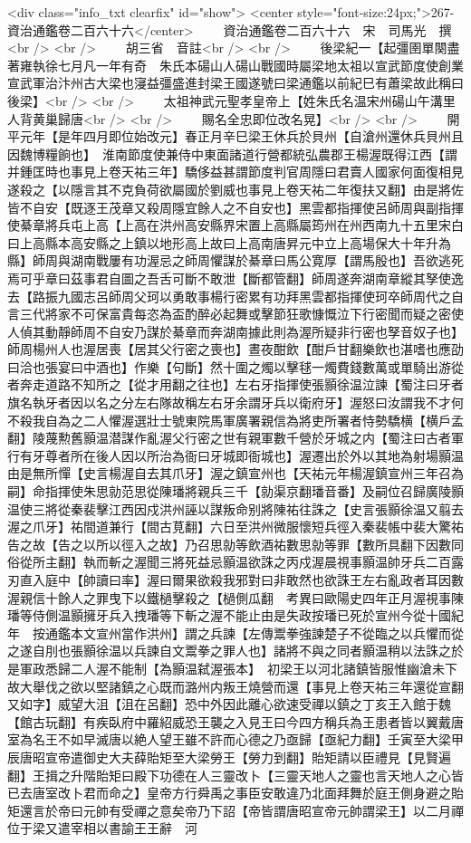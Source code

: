 <div class="info_txt clearfix" id="show">
<center style="font-size:24px;">267-資治通鑑卷二百六十六</center>
  　　資治通鑑卷二百六十六　宋　司馬光　撰<br />
<br />
　　胡三省　音註<br />
<br />
　　後梁紀一【起彊圉單闋盡著雍執徐七月凡一年有奇　朱氏本碭山人碭山戰國時屬梁地太祖以宣武節度使創業宣武軍治汴州古大梁也寖益彊盛進封梁王國遂號曰梁通鑑以前紀巳有蕭梁故此稱曰後梁】<br />
<br />
　　太祖神武元聖孝皇帝上【姓朱氏名温宋州碭山午溝里人背黄巢歸唐<br />
<br />
　　賜名全忠即位改名晃】<br />
<br />
　　開平元年【是年四月即位始改元】春正月辛巳梁王休兵於貝州【自滄州還休兵貝州且因魏博糧餉也】　淮南節度使兼侍中東面諸道行營都統弘農郡王楊渥既得江西【謂并鍾匡時也事見上卷天祐三年】驕侈益甚謂節度判官周隱曰君賣人國家何面復相見遂殺之【以隱言其不克負荷欲屬國於劉威也事見上卷天祐二年復扶又翻】由是將佐皆不自安【既逐王茂章又殺周隱宜餘人之不自安也】黑雲都指揮使呂師周與副指揮使綦章將兵屯上高【上高在洪州高安縣界宋置上高縣屬筠州在州西南九十五里宋白曰上高縣本高安縣之上鎮以地形高上故曰上高南唐昇元中立上高場保大十年升為縣】師周與湖南戰屢有功渥忌之師周懼謀於綦章曰馬公寛厚【謂馬殷也】吾欲逃死焉可乎章曰茲事君自圖之吾舌可斷不敢泄【斷都管翻】師周遂奔湖南章縱其孥使逸去【路振九國志呂師周父珂以勇敢事楊行密累有功拜黑雲都指揮使珂卒師周代之自言三代將家不可保富貴每恣為盃酌醉必起舞或擊節狂歌慷慨泣下行密聞而疑之密使人偵其動靜師周不自安乃謀於綦章而奔湖南據此則為渥所疑非行密也孥音奴子也】師周楊州人也渥居喪【居其父行密之喪也】晝夜酣飲【酣戶甘翻樂飲也湛嗜也應劭曰洽也張宴曰中酒也】作樂【句斷】然十圍之燭以擊毬一燭費錢數萬或單騎出游從者奔走道路不知所之【從才用翻之往也】左右牙指揮使張顥徐温泣諫【蜀注曰牙者旗名執牙者因以名之分左右隊故稱左右牙余謂牙兵以衛府牙】渥怒曰汝謂我不才何不殺我自為之二人懼渥選壯士號東院馬軍廣署親信為將吏所署者恃勢驕横【横戶孟翻】陵蔑勲舊顥温潜謀作亂渥父行密之世有親軍數千營於牙城之内【蜀注曰古者軍行有牙尊者所在後人因以所治為衙曰牙城即衙城也】渥遷出於外以其地為射場顥温由是無所憚【史言楊渥自去其爪牙】渥之鎮宣州也【天祐元年楊渥鎮宣州三年召為嗣】命指揮使朱思勍范思從陳璠將親兵三千【勍渠京翻璠音番】及嗣位召歸廣陵顥温使三將從秦裴擊江西因戍洪州誣以謀叛命别將陳祐往誅之【史言張顥徐温又翦去渥之爪牙】祐間道兼行【間古莧翻】六日至洪州微服懷短兵徑入秦裴帳中裴大驚祐告之故【告之以所以徑入之故】乃召思勍等飲酒祐數思勍等罪【數所具翻下因數同俗從所主翻】執而斬之渥聞三將死益忌顥温欲誅之丙戍渥晨視事顥温帥牙兵二百露刃直入庭中【帥讀曰率】渥曰爾果欲殺我邪對曰非敢然也欲誅王左右亂政者耳因數渥親信十餘人之罪曳下以鐵檛擊殺之【檛側瓜翻　考異曰歐陽史四年正月渥視事陳璠等侍側温顥擁牙兵入拽璠等下斬之渥不能止由是失政按璠已死於宣州今從十國紀年　按通鑑本文宣州當作洪州】謂之兵諫【左傳鬻拳強諫楚子不從臨之以兵懼而從之遂自刖也張顥徐温以兵諫自文鬻拳之罪人也】諸將不與之同者顥温稍以法誅之於是軍政悉歸二人渥不能制【為顥温弑渥張本】　初梁王以河北諸鎮皆服惟幽滄未下故大舉伐之欲以堅諸鎮之心既而潞州内叛王燒營而還【事見上卷天祐三年還從宣翻又如字】威望大沮【沮在呂翻】恐中外因此離心欲速受禪以鎮之丁亥王入館于魏【館古玩翻】有疾臥府中羅紹威恐王襲之入見王曰今四方稱兵為王患者皆以翼戴唐室為名王不如早滅唐以絶人望王雖不許而心德之乃亟歸【亟紀力翻】壬寅至大梁甲辰唐昭宣帝遣御史大夫薛貽矩至大梁勞王【勞力到翻】貽矩請以臣禮見【見賢遍翻】王揖之升階貽矩曰殿下功德在人三靈改卜【三靈天地人之靈也言天地人之心皆已去唐室改卜君而命之】皇帝方行舜禹之事臣安敢違乃北面拜舞於庭王側身避之貽矩還言於帝曰元帥有受禪之意矣帝乃下詔【帝皆謂唐昭宣帝元帥謂梁王】以二月禪位于梁又遣宰相以書諭王王辭　河